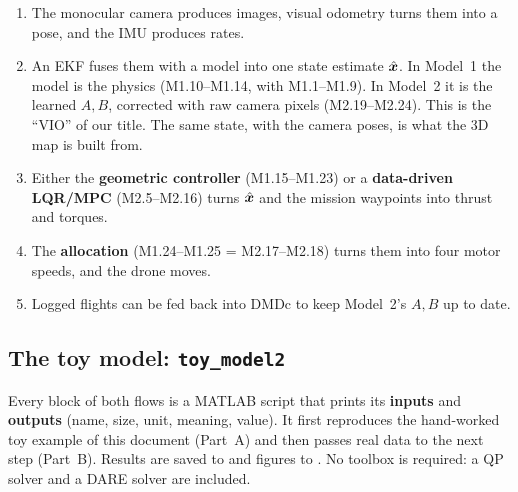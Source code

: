 \begin{enumerate}[leftmargin=*]
  \item The monocular camera produces images, visual odometry turns them into a pose, and the IMU produces rates.
  \item An EKF fuses them with a model into one state estimate $\hat{\bm x}$. In Model~1 the model is the physics
        (M1.10--M1.14, with M1.1--M1.9). In Model~2 it is the learned $A,B$, corrected with raw camera pixels
        (M2.19--M2.24). This is the ``VIO'' of our title. The same state, with the camera poses, is what the 3D map is
        built from.
  \item Either the \textbf{geometric controller} (M1.15--M1.23) or a \textbf{data-driven LQR/MPC} (M2.5--M2.16) turns
        $\hat{\bm x}$ and the mission waypoints into thrust and torques.
  \item The \textbf{allocation} (M1.24--M1.25 = M2.17--M2.18) turns them into four motor speeds, and the drone moves.
  \item Logged flights can be fed back into DMDc to keep Model~2's $A,B$ up to date.
\end{enumerate}

\subsection{The toy model: \texttt{toy\_model2}}

Every block of both flows is a MATLAB script that prints its \textbf{inputs} and \textbf{outputs} (name, size, unit,
meaning, value). It first reproduces the hand-worked toy example of this document (Part~A) and then passes real data
to the next step (Part~B). Results are saved to  and figures to . No toolbox is
required: a QP solver and a DARE solver are included.

